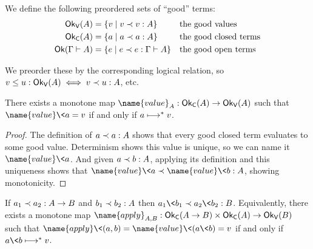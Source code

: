 \begin{definition} We define the following preordered sets of ``good'' terms:
  \begin{align*}
    \goodvalue{A} &= \setfor{v}{\oplrvalue A v v}
    &&\text{the good values}
    \\
    \goodclosed{A} &= \setfor{a}{\oplrclosed A a a}
    && \text{the good closed terms}
    \\
    \goodopen{\Gamma \vdash A} &= \setfor{e}{\oplr{\Gamma \vdash A} e e}
    && \text{the good open terms}
  \end{align*}

  \noindent
  We preorder these by the corresponding logical relation, so $v \le u : \goodvalue A \iff \oplrvalue A v u$, etc.
\end{definition}


\begin{lemma}\label{lemma-closed-term-evaluation}
  There exists a monotone map $\name{value}_A : \goodclosed A \to \goodvalue A$ such that $\name{value}\<a = v$ if and only if $a \evalsto v$.
\end{lemma}

\begin{proof}
  The definition of $\oplrclosed A a a$ shows that every good closed term evaluates to some good value. Determinism shows this value is unique, so we can name it $\name{value}\<a$. And given $\oplrclosed A a b$, applying its definition and this uniqueness shows that $\oplrvalue A {\name{value}\<a} {\name{value}\<b}$, showing monotonicity.
\end{proof}

\begin{lemma}\label{lemma-closed-term-application}
  If $\oplrclosed{A \to B}{a_1}{a_2}$ and $\oplrclosed A {b_1}{b_2}$ then $\oplrclosed B {a_1\<b_1} {a_2\<b_2}$.
%
  Equivalently, there exists a monotone map $\name{apply}_{A,B} : \goodclosed{A \to B} \times \goodclosed A \to \goodvalue B$ such that $\name{apply}\<(a,b) = \name{value}\<(a\<b) = v$ if and only if $a\<b \evalsto v$.
\end{lemma}

